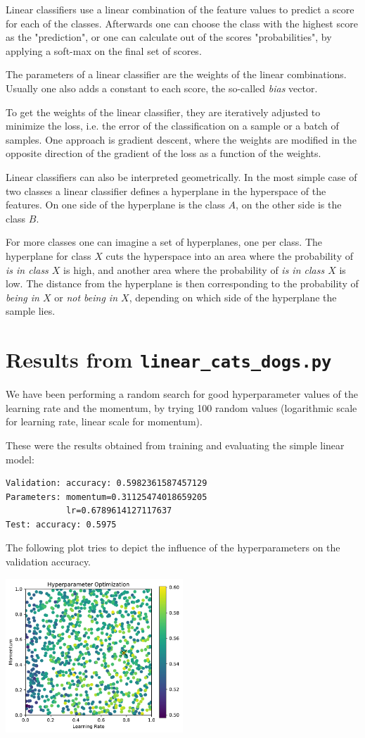 \documentclass[sigconf,nonacm]{acmart}
\begin{document}
Linear classifiers use a linear combination of the feature values
to predict a score for each of the classes.
Afterwards one can choose the class with the highest score
as the "prediction", or one can calculate out of the scores
"probabilities", by applying a soft-max on the final set of scores.

The parameters of a linear classifier are the weights of the linear
combinations.
Usually one also adds a constant to each score, the so-called \emph{bias}
vector.

To get the weights of the linear classifier, they are iteratively
adjusted to minimize the loss, i.e. the error of the classification
on a sample or a batch of samples.
One approach is gradient descent, where the weights are modified
in the opposite direction of the gradient of the loss as a function
of the weights.

Linear classifiers can also be interpreted geometrically.
In the most simple case of two classes a linear classifier defines
a hyperplane in the hyperspace of the features.
On one side of the hyperplane is the class $A$,
on the other side is the class $B$.

For more classes one can imagine a set of hyperplanes, one per class.
The hyperplane for class $X$ cuts the hyperspace into an area
where the probability of \emph{is in class $X$} is high,
and another area where the probability of \emph{is in class $X$}
is low.
The distance from the hyperplane is then corresponding to the
probability of \emph{being in $X$} or \emph{not being in $X$},
depending on which side of the hyperplane the sample lies.

\section{Results from \texttt{linear\_cats\_dogs.py}}
We have been performing a random search for good hyperparameter
values of the learning rate and the momentum, by trying 100 random
values (logarithmic scale for learning rate, linear scale for momentum).

These were the results obtained from training and evaluating
the simple linear model:
\begin{lstlisting}[basicstyle=\ttfamily\small]
Validation: accuracy: 0.5982361587457129
Parameters: momentum=0.31125474018659205
            lr=0.6789614127117637
Test: accuracy: 0.5975
\end{lstlisting}

The following plot tries to depict the influence of the hyperparameters
on the validation
accuracy.

\includegraphics[width=0.5\textwidth]{plot.pdf}



\end{document}
